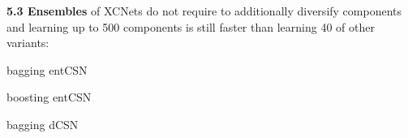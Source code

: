 \documentclass[final]{beamer}
\begin{document}
\begin{frame}{}
\begin{textblock}{17.5}
\vspace{20pt}
{\bf 5.3 Ensembles} of XCNets do not require to additionally
diversify components and learning up to 500 components is still faster
than learning 40 of other variants:

\vspace{10pt}

    \begin{center}
      \begin{minipage}{0.9\linewidth}
        \begin{description}[align=parright]
        \item[\textbf{\textsf{CNet}}$_{\mathsf{bag}}$]
          bagging \textsf{entCSN}~\cite{Rahman2016a}\par
        \item[\textbf{\textsf{CNet}}$_{\mathsf{boost}}$]
          boosting \textsf{entCSN}~\cite{Rahman2016a}\par
        \item[\textbf{\textsf{dCSN}}$^{k}$]
          bagging \textsf{dCSN}~\cite{DiMauro2015a,DiMauro2015b}\par
        \end{description}
      \end{minipage}
    \end{center}

  \end{textblock}




\end{frame}
\end{document}
